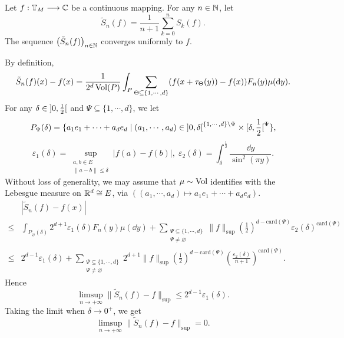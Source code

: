 \begin{theoremenv}[F\'ejer]
    Let $f : \mathbb{T}_{M} \longrightarrow \mathbb{C}$ be a continuous mapping.
    For any $n \in \mathbb{N}$, let
    $$\tilde{S}_n (f) = \frac{1}{n + 1} \sum_{k=0}^{n} S_{k}(f).$$
    The sequence $\left(\tilde{S}_n(f)\right)_{n \in \mathbb{N}}$ converges uniformly to $f$.
\end{theoremenv}
\begin{proofenv}
    By definition,
    $$\tilde{S}_{n}(f)(x) - f(x) = \frac{1}{2^d\operatorname{\mathrm{Vol}}(P)} \int_{P} \sum_{\Theta \subseteq \{1,\cdots,d\}} (f(x + \tau_{\Theta}(y)) - f(x)) F_{n}(y) \mu(\mathrm{d} y).$$
    For any $\delta \in \interval[open]{0}{\frac{1}{2}}$ and $\Psi \subseteq \{1,\cdots,d\}$, we let
    $$P_{\Psi}(\delta) = \{a_1 e_1 + \cdots + a_d e_d \mid (a_1,\cdots,a_d) \in \interval[open]{0}{\delta}^{\{1,\cdots,d\} \setminus \Psi} \times \interval[open right]{\delta}{\frac{1}{2}}^\Psi\},$$
    $$\varepsilon_1(\delta) = \sup_{\substack{a,b \in E\\\|a-b\| \le \delta}} |f(a) - f(b)|, \; \varepsilon_2(\delta) = \int_{\delta}^{\frac{1}{2}} \frac{\dd y}{\sin^2(\pi y)}.$$
    Without loss of generality, we may assume that $\mu \sim \operatorname{\mathrm{Vol}}$ identifies with the Lebesgue measure on $\mathbb{R}^d \cong E$, via $((a_1,\cdots,a_d) \longmapsto a_1 e_1 + \cdots + a_d e_d)$.
    $$\begin{aligned}
        & |\tilde{S}_{n} (f) - f(x)|\\
        \le & \int_{P_{\varnothing}(\delta)} 2^{d+1} \varepsilon_{1}(\delta) F_{n}(y) \mu(\dd y) + \sum_{\substack{\Psi \subseteq \{1,\cdots,d\}\\\Psi \neq \varnothing}} \|f\|_{\text{sup}} \left(\frac{1}{2}\right)^{d - \mathrm{card}(\Psi)} \varepsilon_2(\delta)^{\mathrm{card}(\Psi)}\\
        \le & 2^{d-1} \varepsilon_1(\delta) + \sum_{\substack{\Psi \subseteq \{1,\cdots,d\}\\\Psi \neq \varnothing}} 2^{d+1} \|f\|_{\text{sup}} \left(\frac{1}{2}\right)^{d - \mathrm{card}(\Psi)} \left(\frac{\varepsilon_2(\delta)}{n+1}\right)^{\mathrm{card}(\Psi)}.
    \end{aligned}$$
    Hence
    $$\limsup_{n \to +\infty} \|\tilde{S}_n(f) - f\|_{\text{sup}} \le 2^{d-1} \varepsilon_1(\delta).$$
    Taking the limit when $\delta \to 0^+$, we get
    $$\limsup_{n \to +\infty} \|\tilde{S}_n(f) - f\|_{\text{sup}} = 0.$$
\end{proofenv}

